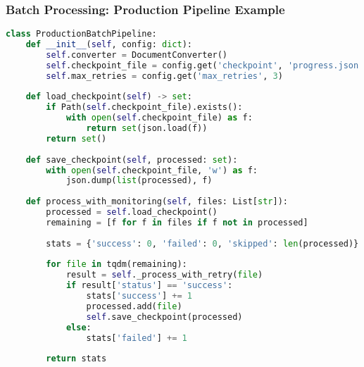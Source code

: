 \begin{frame}[fragile]\frametitle{Batch Processing: Production Pipeline Example}

\begin{lstlisting}[language=Python, basicstyle=\tiny]
class ProductionBatchPipeline:
    def __init__(self, config: dict):
        self.converter = DocumentConverter()
        self.checkpoint_file = config.get('checkpoint', 'progress.json')
        self.max_retries = config.get('max_retries', 3)
        
    def load_checkpoint(self) -> set:
        if Path(self.checkpoint_file).exists():
            with open(self.checkpoint_file) as f:
                return set(json.load(f))
        return set()
    
    def save_checkpoint(self, processed: set):
        with open(self.checkpoint_file, 'w') as f:
            json.dump(list(processed), f)
    
    def process_with_monitoring(self, files: List[str]):
        processed = self.load_checkpoint()
        remaining = [f for f in files if f not in processed]
        
        stats = {'success': 0, 'failed': 0, 'skipped': len(processed)}
        
        for file in tqdm(remaining):
            result = self._process_with_retry(file)
            if result['status'] == 'success':
                stats['success'] += 1
                processed.add(file)
                self.save_checkpoint(processed)
            else:
                stats['failed'] += 1
                
        return stats
\end{lstlisting}
\end{frame}

